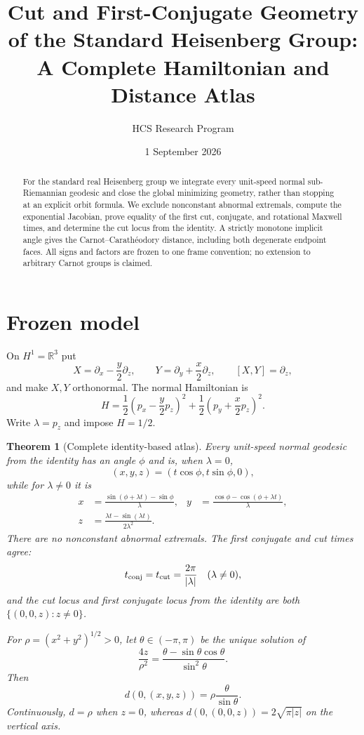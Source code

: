 \documentclass[10pt]{article}
\title{Cut and First-Conjugate Geometry of the Standard Heisenberg Group:\\A Complete Hamiltonian and Distance Atlas}
\author{HCS Research Program}
\date{1 September 2026}
\newtheorem{theorem}{Theorem}
\begin{document}
\maketitle

\begin{abstract}
For the standard real Heisenberg group we integrate every unit-speed normal
sub-Riemannian geodesic and close the global minimizing geometry, rather than
stopping at an explicit orbit formula.  We exclude nonconstant abnormal
extremals, compute the exponential Jacobian, prove equality of the first cut,
conjugate, and rotational Maxwell times, and determine the cut locus from the
identity.  A strictly monotone implicit angle gives the
Carnot--Carath\'eodory distance, including both degenerate endpoint faces.  All
signs and factors are frozen to one frame convention; no extension to
arbitrary Carnot groups is claimed.
\end{abstract}

\section{Frozen model}
On $H^1=\mathbb R^3$ put
\[
 X=\partial_x-\frac y2\partial_z,\qquad
 Y=\partial_y+\frac x2\partial_z,\qquad [X,Y]=\partial_z,
\]
and make $X,Y$ orthonormal.  The normal Hamiltonian is
\[
 H=\frac12\left(p_x-\frac y2p_z\right)^2+
   \frac12\left(p_y+\frac x2p_z\right)^2.
\]
Write $\lambda=p_z$ and impose $H=1/2$.

\begin{theorem}[Complete identity-based atlas]
Every unit-speed normal geodesic from the identity has an angle $\phi$ and is,
when $\lambda=0$,
\[
 (x,y,z)=(t\cos\phi,t\sin\phi,0),
\]
while for $\lambda\ne0$ it is
\begin{align*}
 x&=\frac{\sin(\phi+\lambda t)-\sin\phi}{\lambda},&
 y&=\frac{\cos\phi-\cos(\phi+\lambda t)}{\lambda},\\
 z&=\frac{\lambda t-\sin(\lambda t)}{2\lambda^2}.
\end{align*}
There are no nonconstant abnormal extremals.  The first conjugate and cut
times agree:
\[
 t_{\rm conj}=t_{\rm cut}=\frac{2\pi}{|\lambda|}\quad(\lambda\ne0),
\]
and the cut locus and first conjugate locus from the identity are both
$\{(0,0,z):z\ne0\}$.

For $\rho=(x^2+y^2)^{1/2}>0$, let $\theta\in(-\pi,\pi)$ be the unique solution
of
\[
 \frac{4z}{\rho^2}=\frac{\theta-\sin\theta\cos\theta}{\sin^2\theta}.
\]
Then
\[
 d(0,(x,y,z))=\rho\frac{\theta}{\sin\theta}.
\]
Continuously, $d=\rho$ when $z=0$, whereas
$d(0,(0,0,z))=2\sqrt{\pi|z|}$ on the vertical axis.
\end{theorem}
\end{document}
